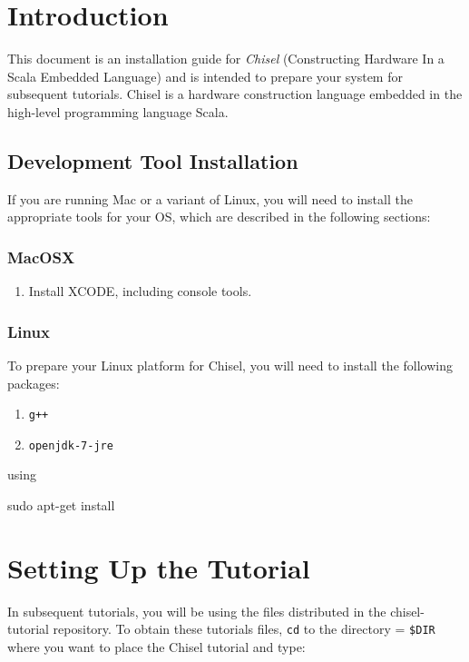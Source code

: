 \section{Introduction}

This document is an installation guide for {\em Chisel} (Constructing
Hardware In a Scala Embedded Language) and is intended to prepare your system for subsequent tutorials.  Chisel is a hardware
construction language embedded in the high-level programming language
Scala.

\subsection{Development Tool Installation}

If you are running Mac or a variant of Linux, you will need to install the appropriate tools for your OS, which are described in the following sections:

\subsubsection{MacOSX}

\begin{enumerate}
\item Install XCODE, including console tools.
\end{enumerate}

\subsubsection{Linux}

To prepare your Linux platform for Chisel, you will need to install the following packages:

\begin{enumerate}
\item \verb|g++|
\item \verb+openjdk-7-jre+
\end{enumerate}

\noindent
using

\begin{bash}
sudo apt-get install
\end{bash}

\section{Setting Up the Tutorial}

In subsequent tutorials, you will be using the files distributed in the chisel-tutorial repository. To obtain these tutorials files, \verb+cd+ to the directory = \verb+$DIR+ where you want to place the Chisel tutorial and type:

